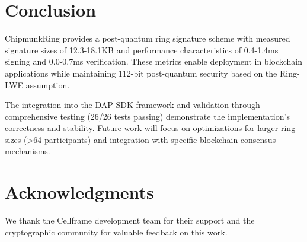 \documentclass[11pt,a4paper]{article}
\begin{document}
\section{Conclusion}

ChipmunkRing provides a post-quantum ring signature scheme with measured signature sizes of 12.3-18.1KB and performance characteristics of 0.4-1.4ms signing and 0.0-0.7ms verification. These metrics enable deployment in blockchain applications while maintaining 112-bit post-quantum security based on the Ring-LWE assumption.

The integration into the DAP SDK framework and validation through comprehensive testing (26/26 tests passing) demonstrate the implementation's correctness and stability. Future work will focus on optimizations for larger ring sizes (>64 participants) and integration with specific blockchain consensus mechanisms.

\section{Acknowledgments}

We thank the Cellframe development team for their support and the cryptographic community for valuable feedback on this work.



\end{document}
